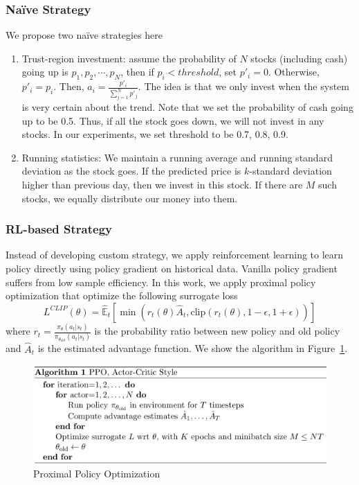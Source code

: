 \documentclass[11pt,a4paper]{article}
\begin{document}
\subsubsection{Na\"ive Strategy}
We propose two na\"ive strategies here
\begin{enumerate}
  \item Trust-region investment: assume the probability of $N$ stocks (including cash) going up is $p_1, p_2, \cdots, p_N$, then if $p_i < threshold$, set $p'_i=0$. Otherwise, $p'_i=p_i$. Then, $a_i=\frac{p'_i}{\sum_{j=1}^{N}p'_j}$. The idea is that we only invest when the system is very certain about the trend. Note that we set the probability of cash going up to be 0.5. Thus, if all the stock goes down, we will not invest in any stocks. In our experiments, we set threshold to be 0.7, 0.8, 0.9.
  \item Running statistics: We maintain a running average and running standard deviation as the stock goes. If the predicted price is $k$-standard deviation higher than previous day, then we invest in this stock. If there are $M$ such stocks, we equally distribute our money into them.
\end{enumerate}
\subsubsection{RL-based Strategy}
Instead of developing custom strategy, we apply reinforcement learning to learn policy directly using policy gradient on historical data. Vanilla policy gradient suffers from low sample efficiency. In this work, we apply proximal policy optimization that optimize the following surrogate loss
\begin{equation}
L^{CLIP}(\theta)=\hat{\mathbb{E}}_t[\min(r_t(\theta)\hat{A}_t, \text{clip}(r_t(\theta), 1-\epsilon, 1+\epsilon))]
\end{equation}
where $r_t=\frac{\pi_\theta(a_t|s_t)}{\pi_{\theta_{old}}(a_t|s_t)}$ is the probability ratio between new policy and old policy and $\hat{A}_t$ is the estimated advantage function. We show the algorithm in Figure~\ref{fig:ppo}.
\begin{figure}
  \centering
  \includegraphics[width=\linewidth]{ppo}
  \caption{Proximal Policy Optimization}
  \label{fig:ppo}
\end{figure}
\end{document}

